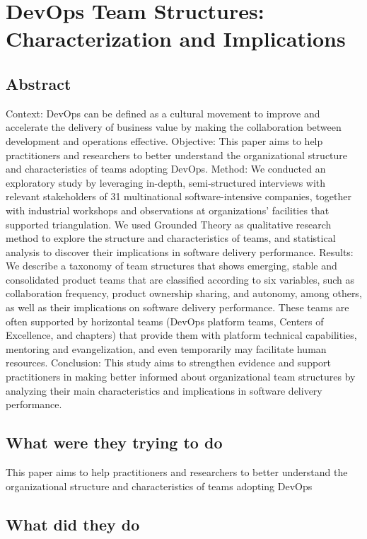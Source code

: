 \section{DevOps Team Structures: Characterization and Implications}

\subsection{Abstract}

Context: DevOps can be defined as a cultural movement to improve and accelerate the delivery of business value by making the collaboration between development and operations effective. Objective: This paper aims to help practitioners and researchers to better understand the organizational structure and characteristics of teams adopting DevOps. Method: We conducted an exploratory study by leveraging in-depth, semi-structured interviews with relevant stakeholders of 31 multinational software-intensive companies, together with industrial workshops and observations at organizations’ facilities that supported triangulation. We used Grounded Theory as qualitative research method to explore the structure and characteristics of teams, and statistical analysis to discover their implications in software delivery performance. Results: We describe a taxonomy of team structures that shows emerging, stable and consolidated product teams that are classified according to six variables, such as collaboration frequency, product ownership sharing, and autonomy, among others, as well as their implications on software delivery performance. These teams are often supported by horizontal teams (DevOps platform teams, Centers of Excellence, and chapters) that provide them with platform technical capabilities, mentoring and evangelization, and even temporarily may facilitate human resources. Conclusion: This study aims to strengthen evidence and support practitioners in making better informed about organizational team structures by analyzing their main characteristics and implications in software delivery performance.

\subsection{What were they trying to do}

This paper aims to help practitioners and researchers to better understand the organizational structure and characteristics of teams adopting DevOps

\subsection{What did they do}

